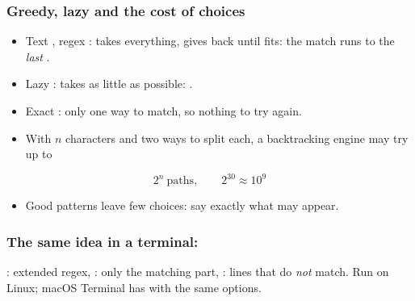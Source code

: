 \documentclass[aspectratio=169,10pt,compress]{beamer}
\begin{document}
\begin{frame}[t,fragile] \frametitle{Greedy, lazy and the cost of choices}
  \begin{itemize}\small
    \item Text , regex :
       takes everything, gives back until  fits: the match runs to the \emph{last} .
    \item Lazy : takes as little as possible: .
    \item Exact : only one way to match, so nothing to try again.
    \item With $n$ characters and two ways to split each, a backtracking engine may try up to
  \end{itemize}
  \[
  	2^{n} \ \mathrm{paths}, \qquad 2^{30} \approx 10^{9}
  \]
  \begin{itemize}\small
    \item Good patterns leave few choices: say exactly what may appear.
  \end{itemize}
\end{frame}





\begin{frame}[t,fragile] \frametitle{The same idea in a terminal: }

  \vspace{0.1em}
  \small
  : extended regex, : only the matching part, : lines that do \emph{not} match. Run on Linux; macOS Terminal has  with the same options.
\end{frame}
\end{document}
